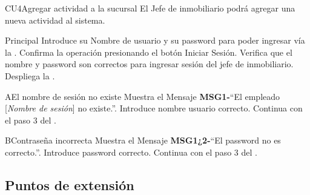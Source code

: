 \begin{UseCase}{CU4}{Agregar actividad a la sucursal}{
		El Jefe de inmobiliario podrá agregar una nueva actividad al sistema.
	}
\end{UseCase}
\begin{UCtrayectoria}{Principal}
	\UCpaso[\UCactor] Introduce su Nombre de usuario y su password para poder ingresar vía la  \label{CU1LoginJI}.
	\UCpaso[\UCactor] Confirma la operación presionando el botón Iniciar Sesión.
	\UCpaso Verifica que el nombre y password son correctos para ingresar sesión del jefe de inmobiliario.
	\UCpaso Despliega la .
\end{UCtrayectoria}

\begin{UCtrayectoriaA}{A}{El nombre de sesión no existe}
	\UCpaso[\UCactor] Muestra el Mensaje {\bf MSG1-}``El empleado [{\em Nombre de sesión}] no existe.''.
	\UCpaso[\UCactor] Introduce nombre usuario correcto.
	\UCpaso[] Continua con el paso 3 del .
\end{UCtrayectoriaA}

\begin{UCtrayectoriaA}{B}{Contraseña incorrecta}
	\UCpaso Muestra el Mensaje {\bf MSG1¿2-}``El password no es correcto.''.
	\UCpaso[\UCactor] Introduce password correcto.
	\UCpaso[] Continua con el paso 3 del .
\end{UCtrayectoriaA}


\subsection{Puntos de extensión}
